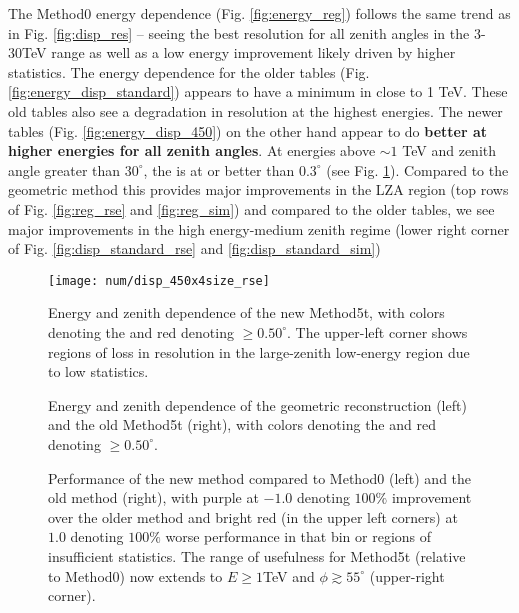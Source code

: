 \documentclass[main.tex]{subfiles}
\begin{document}
The Method0 energy dependence (Fig. \ref{fig:energy_reg}) follows the same trend as in Fig. \ref{fig:disp_res} -- seeing the best resolution for all zenith angles in the 3-30TeV range as well as a low energy improvement likely driven by higher statistics. The energy dependence for the older \disp tables (Fig. \ref{fig:energy_disp_standard}) appears to have a minimum in \rse close to 1 TeV. These old \disp tables also see a degradation in resolution at the highest energies. The newer \disp tables (Fig. \ref{fig:energy_disp_450}) on the other hand appear to do {\bf better at higher energies for all zenith angles}. At energies above $\sim 1$ TeV and zenith angle greater than $30^\circ$, the \rse is at or better than $0.3^\circ$ (see Fig. \ref{fig:energy_new_contour}). Compared to the geometric method this provides major improvements in the LZA region (top rows of Fig. \ref{fig:reg_rse} and \ref{fig:reg_sim}) and compared to the older \disp tables, we see major improvements in the high energy-medium zenith regime (lower right corner of Fig. \ref{fig:disp_standard_rse} and \ref{fig:disp_standard_sim})

\begin{figure}[htbp]
  \centering
  \texttt{[image: num/disp\_450x4size\_rse]}
  \caption[Energy and zenith dependence of the new Method5t.]{Energy and zenith dependence of the new Method5t, with colors denoting the \rse and red denoting \rse$\geq0.50^\circ$. The upper-left corner shows regions of loss in resolution in the large-zenith low-energy region due to low statistics.}
  \label{fig:energy_new_contour}
\end{figure}

\begin{figure}[htbp]
  \centering
  \caption[Energy and zenith dependence of Method0 and the old Method5t]{Energy and zenith dependence of the geometric reconstruction (left) and the old Method5t (right), with colors denoting the \rse and red denoting \rse$\geq0.50^\circ$.}
  \label{fig:energy_contour}
\end{figure}

\begin{figure}[htbp]
  \centering
  \caption[Performance of the new \disp method compared to Method0 and the old \disp method]{Performance of the new \disp method compared to Method0 (left) and the old \disp method (right), with purple at $-1.0$ denoting $100\%$ improvement over the older method and bright red (in the upper left corners) at $1.0$ denoting $100\%$ worse performance in that bin or regions of insufficient statistics. The range of usefulness for Method5t (relative to Method0) now extends to $E\geq1$TeV and $\phi\gtrsim55^\circ$ (upper-right corner).}
  \label{fig:energy_rel}
\end{figure}
\end{document}
